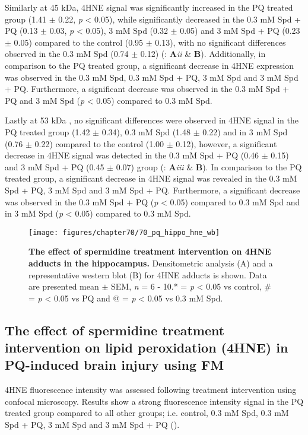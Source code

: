 Similarly at 45 kDa, 4HNE signal was significantly increased in the PQ treated group (1.41 $\pm$ 0.22, \textit{p} < 0.05), while significantly decreased in the 0.3 mM Spd + PQ (0.13 $\pm$ 0.03, \textit{p} < 0.05), 3 mM Spd (0.32 $\pm$ 0.05) and 3 mM Spd + PQ (0.23 $\pm$ 0.05) compared to the control (0.95 $\pm$ 0.13), with no significant differences observed in the 0.3 mM Spd (0.74 $\pm$ 0.12) (: \textbf{A}\textit{ii} \& \textbf{B}). Additionally, in comparison to the PQ treated group, a significant decrease in 4HNE expression was observed in the 0.3 mM Spd, 0.3 mM Spd + PQ, 3 mM Spd and 3 mM Spd + PQ. Furthermore, a significant decrease was observed in the 0.3 mM Spd + PQ and 3 mM Spd (\textit{p} < 0.05) compared to 0.3 mM Spd.

Lastly at 53 kDa , no significant differences were observed in 4HNE signal in the PQ treated group (1.42 $\pm$ 0.34), 0.3 mM Spd (1.48 $\pm$ 0.22) and in 3 mM Spd (0.76 $\pm$ 0.22) compared to the control (1.00 $\pm$ 0.12), however, a significant decrease in 4HNE signal was detected in the 0.3 mM Spd + PQ (0.46 $\pm$ 0.15) and 3 mM Spd + PQ (0.45 $\pm$ 0.07) group (: \textbf{A}\textit{iii} \& \textbf{B}). In comparison to the PQ treated group, a significant decrease in 4HNE signal was revealed in the 0.3 mM Spd + PQ, 3 mM Spd and 3 mM Spd + PQ. Furthermore, a significant decrease was observed in the 0.3 mM Spd + PQ (\textit{p} < 0.05) compared to 0.3 mM Spd and in 3 mM Spd (\textit{p} < 0.05) compared to 0.3 mM Spd. 

\begin{landscape}
\begin{figure}[!htbp]
\center
  \texttt{[image: figures/chapter70/70\_pq\_hippo\_hne\_wb]}
  \caption[The effect of spermidine treatment intervention on 4HNE adducts in the hippocampus]{\textbf{The effect of spermidine treatment intervention on 4HNE adducts in the hippocampus.} Densitometric analysis (A) and a representative western blot (B) for 4HNE adducts is shown. Data are presented  mean $\pm$ SEM, \textit{n} = 6 - 10.* = \textit{p} < 0.05 vs control, \# = \textit{p} < 0.05 vs PQ and @ = \textit{p} < 0.05 vs 0.3 mM Spd.}
  \label{fig:70_pq_hippo_hne_wb}
\end{figure} 
\end{landscape}

\subsection{The effect of spermidine treatment intervention on lipid peroxidation (4HNE) in PQ-induced brain injury using FM}
4HNE fluorescence intensity was assessed following treatment intervention using confocal microscopy. Results show a strong fluorescence intensity signal in the PQ treated group compared to all other groups; i.e. control, 0.3 mM Spd, 0.3 mM Spd + PQ, 3 mM Spd and 3 mM Spd + PQ ().

